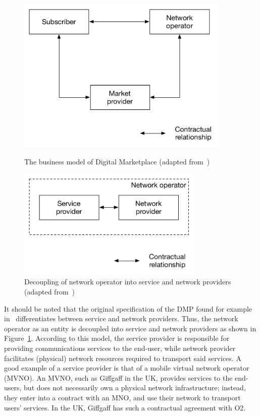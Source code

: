 \begin{figure}[p]
	\includegraphics[width=4in]{DMP/Figures/dmp_model}
	\caption{The business model of Digital Marketplace (adapted from~\cite{DMIrvine02})}
	\label{fig:dmp_model_dmp}
	\vspace{10mm}
	\includegraphics[width=3.5in]{DMP/Figures/no_decoupled}
	\caption{Decoupling of network operator into service and network providers (adapted from~\cite{DMIrvine02})}
	\label{fig:no_decoupled_dmp}
\end{figure}

It should be noted that the original specification of the DMP found for example in~\cite{DMLeBodic00,DMIrvine02,LeBodicThesis} differentiates between service and network providers. Thus, the network operator as an entity is decoupled into service and network providers as shown in Figure~\ref{fig:no_decoupled_dmp}. According to this model, the service provider is responsible for providing communications services to the end-user, while network provider facilitates (physical) network resources required to transport said services. A good example of a service provider is that of a mobile virtual network operator (MVNO). An MVNO, such as Giffgaff in the UK, provides services to the end-users, but does not necessarily own a physical network infrastructure; instead, they enter into a contract with an MNO, and use their network to transport users' services. In the UK, Giffgaff has such a contractual agreement with O2.

